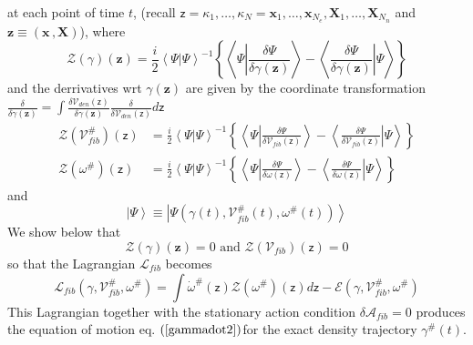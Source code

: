 \documentclass[aps,preprint]{revtex4}%
\begin{document}
at each point of time $t$, (recall $\mathsf{z}=\kappa_{1},\ldots,\kappa
_{N}=\mathbf{x}_{1},\ldots,\mathbf{x}_{N_{e}},\mathbf{X}_{1},\ldots
,\mathbf{X}_{N_{n}}$ and $\mathbf{z}\equiv(\mathbf{x}\,,\mathbf{X})$), where
\begin{equation}
\mathcal{Z}\left(  \mathcal{\gamma}\right)  \left(  \mathbf{z}\right)
=\frac{i}{2}\left\langle \Psi|\Psi\right\rangle ^{-1}\left\{  \left\langle
\Psi\left|  \frac{\delta\Psi}{\delta\mathcal{\gamma}\left(  \mathbf{z}\right)
}\right.  \right\rangle -\left\langle \left.  \frac{\delta\Psi}{\delta
\mathcal{\gamma}\left(  \mathbf{z}\right)  }\right|  \Psi\right\rangle
\right\}
\end{equation}
and the derrivatives wrt $\gamma\left(  \mathbf{z}\right)  $ are given by the
coordinate transformation $\frac{\delta}{\delta\gamma\left(  \mathbf{z}%
\right)  }=\int\frac{\delta\mathcal{V}_{den}\left(  \mathsf{z}\right)
}{\delta\gamma\left(  \mathbf{z}\right)  }\frac{\delta}{\delta\mathcal{V}%
_{den}\left(  \mathsf{z}\right)  }d\mathsf{z}$%
\begin{align}
\mathcal{Z}\left(  \mathcal{V}_{fib}^{\#}\right)  \left(  \mathsf{z}\right)
&  =\frac{i}{2}\left\langle \Psi|\Psi\right\rangle ^{-1}\left\{  \left\langle
\Psi\left|  \frac{\delta\Psi}{\delta\mathcal{V}_{fib}\left(  \mathsf{z}%
\right)  }\right.  \right\rangle -\left\langle \left.  \frac{\delta\Psi
}{\delta\mathcal{V}_{fib}\left(  \mathsf{z}\right)  }\right|  \Psi
\right\rangle \right\} \nonumber\\
\mathcal{Z}\left(  \omega^{\#}\right)  \left(  \mathsf{z}\right)   &
=\frac{i}{2}\left\langle \Psi|\Psi\right\rangle ^{-1}\left\{  \left\langle
\Psi\left|  \frac{\delta\Psi}{\delta\omega\left(  \mathsf{z}\right)  }\right.
\right\rangle -\left\langle \left.  \frac{\delta\Psi}{\delta\omega\left(
\mathsf{z}\right)  }\right|  \Psi\right\rangle \right\}
\end{align}
and
\begin{equation}
\left|  \Psi\right\rangle \equiv\left|  \Psi\left(  \gamma\left(  t\right)
,\mathcal{V}_{fib}^{\#}\left(  t\right)  ,\omega^{\#}\left(  t\right)
\right)  \right\rangle
\end{equation}
We show below that
\begin{equation}
\mathcal{Z}\left(  \mathcal{\gamma}\right)  \left(  \mathbf{z}\right)
=0\text{ and }\mathcal{Z}\left(  \mathcal{V}_{fib}\right)  \left(
\mathsf{z}\right)  =0
\end{equation}
so that the Lagrangian $\mathcal{L}_{fib}$ becomes
\begin{equation}
\mathcal{L}_{fib}\left(  \gamma,\mathcal{V}_{fib}^{\#},\omega^{\#}\right)
=\int\mathcal{\dot{\omega}}^{\#}\left(  \mathsf{z}\right)  \mathcal{Z}\left(
\mathcal{\omega}^{\#}\right)  \left(  \mathsf{z}\right)  d\mathsf{z}%
-\mathcal{E}\left(  \gamma,\mathcal{V}_{fib}^{\#},\mathcal{\omega}%
^{\#}\right)
\end{equation}
This Lagrangian together with the stationary action condition $\delta
\mathcal{A}_{fib}=0$ produces the equation of motion eq. $\left(
\ref{gammadot2}\right)  $for the exact density trajectory $\gamma^{\#}\left(
t\right)  $.
\end{document}
